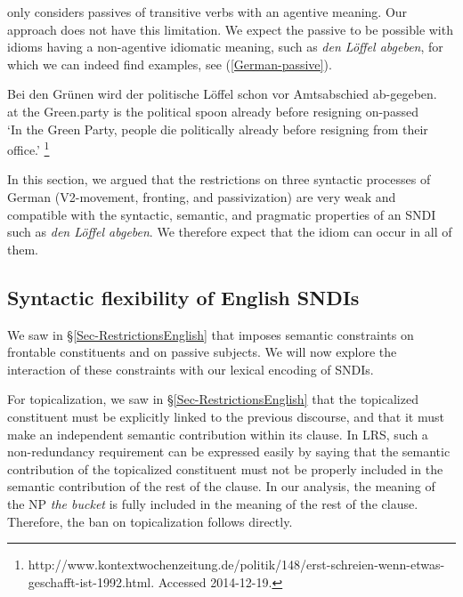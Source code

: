 \documentclass[output=paper]{langsci/langscibook}
\begin{document}
\cite{Dobrovolskij:00} only considers  passives of transitive verbs with an agentive meaning.
Our approach does not have this limitation. We expect the passive to be possible with idioms having a non-agentive idiomatic meaning, such as \textit{den L\"offel abgeben}, for which we can indeed find examples, see   (\ref{German-passive}).

\ea
\gll Bei den Gr\"unen wird der politische L\"offel schon vor Amtsabschied ab-gegeben. \\
at the Green.party is the political spoon already before resigning {on-passed} \\
\glt `In the Green Party, people die politically already before resigning from their office.'%
\footnote{http://www.kontextwochenzeitung.de/politik/148/erst-schreien-wenn-etwas-geschafft-ist-1992.html. Accessed 2014-12-19.}
\label{German-passive}
\z

In this section, we argued that the restrictions on three syntactic processes of  German (V2-movement, fronting, and passivization) are very weak and compatible with the syntactic, semantic, and pragmatic properties of an SNDI such as \textit{den L\"offel abgeben}. We therefore expect that the idiom can occur in all of them.

\subsection{Syntactic flexibility of English SNDIs}
\label{Sec-AnalysisEnglish}

We saw in §\ref{Sec-RestrictionsEnglish} that  imposes semantic constraints on  frontable constituents and on passive subjects. We will now explore the interaction of these constraints with our lexical encoding of SNDIs.

For  topicalization, we saw in §\ref{Sec-RestrictionsEnglish} that the topicalized constituent must be explicitly linked to the previous discourse, and that it must make an independent semantic contribution within its clause. In LRS, such a non-redundancy requirement can be expressed easily by saying that the semantic contribution of the topicalized constituent must not be properly included in the semantic contribution of the rest of the clause. In our analysis, the meaning of the NP \textit{the bucket} is fully included in the meaning of the rest of the clause. Therefore, the ban on topicalization follows directly.
\end{document}
